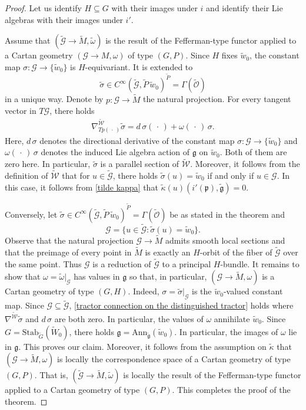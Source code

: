\documentclass[11pt]{amsart}
\begin{document}
\begin{proof}
Let us identify $H\subseteq G$ with their images under $i$ and identify their Lie algebras with their images under $i'$.

Assume that $(\tilde{\mathcal G}\to\tilde M,\tilde\omega)$ is the result of the Fefferman-type functor applied to a Cartan geometry $(\mathcal G\to M,\omega)$ of type $(G,P)$. Since $H$ fixes $\tilde w_0$, the constant map $\sigma:\mathcal G\to\{\tilde w_0\}$ is $H$-equivariant. It is extended to 
\[\tilde\sigma\in C^\infty(\tilde{\mathcal G},\tilde P\,\tilde w_0)^{\tilde P}=\Gamma(\tilde{\mathcal O})\]
in a unique way. Denote by $p:\mathcal G\to \tilde M$ the natural projection. For every tangent vector in $T\mathcal G$, there holds
\begin{align}\label{tractor connection on the distinguished tractor}
    \nabla^{\tilde{\mathcal W}}_{Tp(\,\cdot\,)}\tilde\sigma=d\,\sigma(\,\cdot\,)+\omega(\,\cdot\,)\,\sigma.
\end{align}
Here, $d\,\sigma$ denotes the directional derivative of the constant map $\sigma:\mathcal G\to\{\tilde w_0\}$ and $\omega(\,\cdot\,)\,\sigma$ denotes the induced Lie algebra action of $\mathfrak g$ on $\tilde w_0$. Both of them are zero here. In particular, $\tilde\sigma$ is a parallel section of $\tilde{\mathcal W}$. Moreover, it follows from the definition of $\tilde{\mathcal W}$ that for $u\in\tilde{\mathcal G}$, there holds $\tilde\sigma(u)=\tilde w_0$ if and only if $u\in\mathcal G$. In this case, it follows from \eqref{tilde kappa} that $\tilde\kappa(u)(i'(\mathfrak p),\tilde{\mathfrak g})=0$.

Conversely, let $\tilde\sigma\in C^\infty(\tilde{\mathcal G},\tilde P\,\tilde w_0)^{\tilde P}=\Gamma(\tilde{\mathcal O})$ be as stated in the theorem and
\[\mathcal G=\{u\in\tilde{\mathcal G}:\tilde\sigma(u)=\tilde w_0\}.\]
Observe that the natural projection $\mathcal G\to\tilde M$ admits smooth local sections and that the preimage of every point in $\tilde M$ is exactly an $H$-orbit of the fiber of $\tilde{\mathcal G}$ over the same point. Thus $\mathcal G$ is a reduction of $\tilde{\mathcal G}$ to a principal $H$-bundle. It remains to show that $\omega=\tilde\omega|_{\mathcal G}$ has values in $\mathfrak g$ so that, in particular, $(\mathcal G\to\tilde M,\omega)$ is a Cartan geometry of type $(G,H)$. Indeed, $\sigma=\tilde\sigma|_{\mathcal G}$ is the $\tilde w_0$-valued constant map. Since $\mathcal G\subseteq\tilde{\mathcal G}$, \eqref{tractor connection on the distinguished tractor} holds where $\nabla^{\tilde{\mathcal W}}\tilde\sigma$ and $d\,\sigma$ are both zero. In particular, the values of $\omega$ annihilate $\tilde w_0$. Since $G=\mathrm{Stab}_{\tilde G}(\tilde W_0)$, there holds $\mathfrak g=\mathrm{Ann}_{\tilde{\mathfrak g}}(\tilde w_0)$. In particular, the images of $\omega$ lie in $\mathfrak g$. This proves our claim. Moreover, it follows from the assumption on $\tilde\kappa$ that $(\mathcal G\to\tilde M,\omega)$ is locally the correspondence space of a Cartan geometry of type $(G,P)$. That is, $(\tilde{\mathcal G}\to\tilde M,\tilde\omega)$ is locally the result of the Fefferman-type functor applied to a Cartan geometry of type $(G,P)$. This completes the proof of the theorem.
\end{proof}
\end{document}
